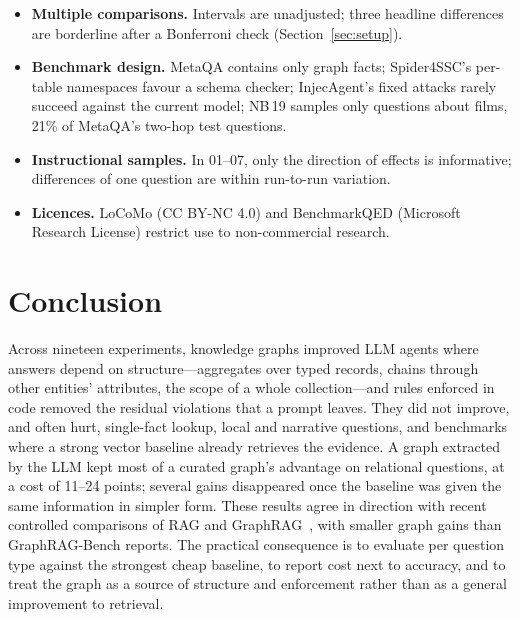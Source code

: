 \documentclass[11pt,a4paper]{article}
\newcommand{\nb}[1]{NB\,#1}
\begin{document}
\begin{itemize}
        5 runs; only the plan graph has a confidence run.
  \item \textbf{Multiple comparisons.} Intervals are unadjusted; three headline differences are borderline after a
        Bonferroni check (Section~\ref{sec:setup}).
  \item \textbf{Benchmark design.} MetaQA contains only graph facts; Spider4SSC's per-table namespaces favour a
        schema checker; InjecAgent's fixed attacks rarely succeed against the current model; \nb{19} samples only questions
        about films, 21\% of MetaQA's two-hop test questions.
  \item \textbf{Instructional samples.} In 01--07, only the direction of effects is informative; differences of one
        question are within run-to-run variation.
  \item \textbf{Licences.} LoCoMo (CC BY-NC 4.0) and BenchmarkQED (Microsoft Research License) restrict use to
        non-commercial research.
\end{itemize}

\section{Conclusion}

Across nineteen experiments, knowledge graphs improved LLM agents where answers depend on structure---aggregates
over typed records, chains through other entities' attributes, the scope of a whole collection---and rules enforced
in code removed the residual violations that a prompt leaves. They did not improve, and often hurt, single-fact
lookup, local and narrative questions, and benchmarks where a strong vector baseline already retrieves the evidence.
A graph extracted by the LLM kept most of a curated graph's advantage on relational questions, at a cost of 11--24
points; several gains disappeared once the baseline was given the same information in simpler form. These results agree in
direction with recent controlled comparisons of RAG and GraphRAG~\cite{han2025ragvsgraphrag,xiang2025graphragbench},
with smaller graph gains than GraphRAG-Bench reports. The practical
consequence is to evaluate per question type against the strongest cheap baseline, to report cost next to accuracy,
and to treat the graph as a source of structure and enforcement rather than as a general improvement to retrieval.
\end{document}
